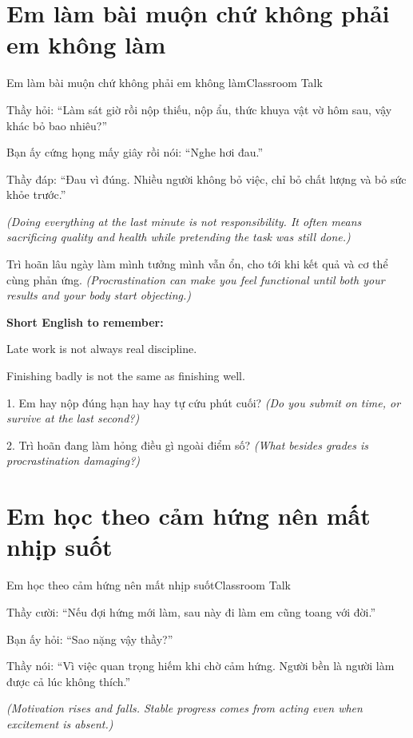 \section{Em làm bài muộn chứ không phải em không làm}
\begin{truyen}{Em làm bài muộn chứ không phải em không làm}{Classroom Talk}

Thầy hỏi: ``Làm sát giờ rồi nộp thiếu, nộp ẩu, thức khuya vật vờ hôm sau, vậy khác bỏ bao nhiêu?''

Bạn ấy cứng họng mấy giây rồi nói: ``Nghe hơi đau.''

Thầy đáp: ``Đau vì đúng. Nhiều người không bỏ việc, chỉ bỏ chất lượng và bỏ sức khỏe trước.''

\textit{(Doing everything at the last minute is not responsibility. It often means sacrificing quality and health while pretending the task was still done.)}
\end{truyen}

\begin{baihoc}
Trì hoãn lâu ngày làm mình tưởng mình vẫn ổn, cho tới khi kết quả và cơ thể cùng phản ứng.
\textit{(Procrastination can make you feel functional until both your results and your body start objecting.)}
\end{baihoc}

\begin{ghinhoanh}
\textbf{Short English to remember:}

Late work is not always real discipline.

Finishing badly is not the same as finishing well.
\end{ghinhoanh}

\begin{tuhocnhanh}
1. Em hay nộp đúng hạn hay hay tự cứu phút cuối? \textit{(Do you submit on time, or survive at the last second?)}

2. Trì hoãn đang làm hỏng điều gì ngoài điểm số? \textit{(What besides grades is procrastination damaging?)}
\end{tuhocnhanh}
\ngancach

\section{Em học theo cảm hứng nên mất nhịp suốt}
\begin{truyen}{Em học theo cảm hứng nên mất nhịp suốt}{Classroom Talk}

Thầy cười: ``Nếu đợi hứng mới làm, sau này đi làm em cũng toang với đời.''

Bạn ấy hỏi: ``Sao nặng vậy thầy?''

Thầy nói: ``Vì việc quan trọng hiếm khi chờ cảm hứng. Người bền là người làm được cả lúc không thích.''

\textit{(Motivation rises and falls. Stable progress comes from acting even when excitement is absent.)}
\end{truyen}


